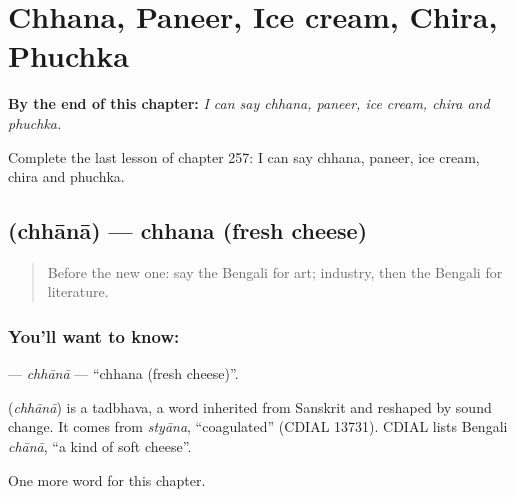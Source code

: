 
\chapter{Chhana, Paneer, Ice cream, Chira, Phuchka}
\label{ch:bn-chhana-paneer-ice-cream-chira-phuchka}

\begin{chapteropening}
\textbf{By the end of this chapter:} \emph{I can say chhana, paneer, ice cream, chira and phuchka.}

Complete the last lesson of chapter 257: I can say chhana, paneer, ice cream, chira and phuchka.
\end{chapteropening}

\section[\texorpdfstring{\bn{ছানা} (chhānā)}{ছানা (chhānā)}]{ (chhānā) — chhana (fresh cheese)}

\label{lesson:BN-C257-chhana}



\begin{quote}
Before the new one: say the Bengali for art; industry, then the Bengali for literature.
\end{quote}

\subsection*{You'll want to know: }
\textbf{} — \emph{chhānā} — \textquotedblleft{}chhana (fresh cheese)\textquotedblright{}.

\begin{cousinweb}
\textbf{} (\emph{chhānā}) is a tadbhava, a word inherited from Sanskrit and reshaped by sound change. It comes from \emph{styāna}, \textquotedblleft{}coagulated\textquotedblright{} (CDIAL 13731). CDIAL lists Bengali \emph{chānā}, \textquotedblleft{}a kind of soft cheese\textquotedblright{}.
\end{cousinweb}

\begin{grammarlens}[title={What you've built}]
One more word for this chapter.
\end{grammarlens}

